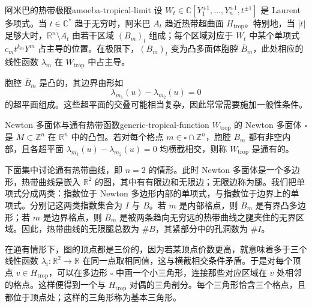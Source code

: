 \begin{theorem}{阿米巴的热带极限}{amoeba-tropical-limit}
设 $W_t\in\mathbb C[Y_1^{\pm1},\ldots,Y_n^{\pm1},t^{\pm1}]$ 是 Laurent 多项式。当 $t\in\mathbb C^*$ 趋于无穷时，阿米巴 $A_t$ 趋近热带超曲面 $H_{\mathrm{trop}}$。特别地，当 $|t|$ 足够大时，$\mathbb R^n\setminus A_t$ 由若干区域 $(B_m)_t$ 组成；每个区域对应于 $W_t$ 中某个单项式 $c_mt^{k_m}Y^m$ 占主导的位置。在极限下，$(B_m)_t$ 变为凸多面体胞腔 $\overline B_m$，此处相应的线性函数 $\lambda_m$ 在 $W_{\mathrm{trop}}$ 中占主导。
\end{theorem}

胞腔 $\overline B_m$ 是凸的，其边界由形如
\[
  \lambda_{m_1}(u)-\lambda_{m_2}(u)=0
\]
的超平面组成。这些超平面的交叠可能相当复杂，因此常常需要施加一般性条件。

\begin{definition}{Newton 多面体与通有热带函数}{generic-tropical-function}
$W_{\mathrm{trop}}$ 的 Newton 多面体 $\square$ 是 $M\subset\mathbb Z^n$ 在 $\mathbb R^n$ 中的凸包。若对每个格点 $m\in\square\cap\mathbb Z^n$，胞腔 $\overline B_m$ 都有非空内部，且各超平面 $\lambda_{m_1}(u)-\lambda_{m_2}(u)=0$ 均横截相交，则称 $W_{\mathrm{trop}}$ 是通有的。
\end{definition}

下面集中讨论通有热带曲线，即 $n=2$ 的情形。此时 Newton 多面体是一个多边形，热带曲线是嵌入 $\mathbb R^2$ 的图，其中有有限边和无限边；无限边称为腿。我们把单项式分成两类：指数位于 Newton 多边形内部的单项式，与指数位于边界上的单项式。分别记这两类指数集合为 $I$ 与 $B$。若 $m$ 是内部格点，则 $\overline B_m$ 是有界凸多边形；若 $m$ 是边界格点，则 $\overline B_m$ 是被两条趋向无穷远的热带曲线之腿夹住的无界区域。因此，热带曲线的无限腿总数为 $\#B$，其紧部分中的孔洞数为 $\#I$。

在通有情形下，图的顶点都是三价的，因为若某顶点价数更高，就意味着多于三个线性函数 $\lambda_i\colon\mathbb R^2\to\mathbb R$ 在同一点取相同值，这与横截相交条件矛盾。于是对每个顶点 $v\in H_{\mathrm{trop}}$，可以在多边形 $\square$ 中画一个小三角形，连接那些对应区域在 $v$ 处相邻的格点。这样便得到一个与 $H_{\mathrm{trop}}$ 对偶的三角剖分。每个三角形恰含三个格点，且都位于顶点处；这样的三角形称为基本三角形。


